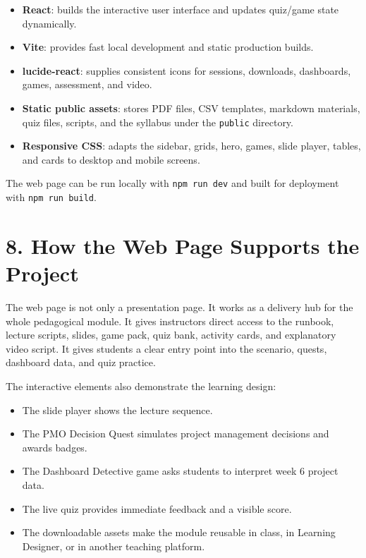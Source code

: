 \documentclass[11pt,a4paper]{article}
\begin{document}
\begin{itemize}
  \item \textbf{React}: builds the interactive user interface and updates quiz/game state dynamically.
  \item \textbf{Vite}: provides fast local development and static production builds.
  \item \textbf{lucide-react}: supplies consistent icons for sessions, downloads, dashboards, games, assessment, and video.
  \item \textbf{Static public assets}: stores PDF files, CSV templates, markdown materials, quiz files, scripts, and the syllabus under the \texttt{public} directory.
  \item \textbf{Responsive CSS}: adapts the sidebar, grids, hero, games, slide player, tables, and cards to desktop and mobile screens.
\end{itemize}

The web page can be run locally with \texttt{npm run dev} and built for deployment with \texttt{npm run build}.

\section*{8. How the Web Page Supports the Project}

The web page is not only a presentation page. It works as a delivery hub for the whole pedagogical module. It gives instructors direct access to the runbook, lecture scripts, slides, game pack, quiz bank, activity cards, and explanatory video script. It gives students a clear entry point into the scenario, quests, dashboard data, and quiz practice.

The interactive elements also demonstrate the learning design:

\begin{itemize}
  \item The slide player shows the lecture sequence.
  \item The PMO Decision Quest simulates project management decisions and awards badges.
  \item The Dashboard Detective game asks students to interpret week 6 project data.
  \item The live quiz provides immediate feedback and a visible score.
  \item The downloadable assets make the module reusable in class, in Learning Designer, or in another teaching platform.
\end{itemize}
\end{document}
